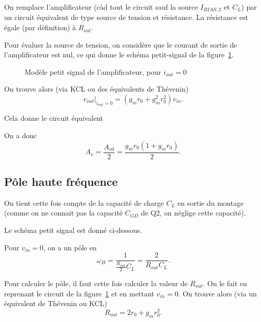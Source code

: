 \documentclass[frenchb,DIV=14]{scrartcl}
\begin{document}
On remplace l'amplificateur (càd tout le circuit sauf la source $I_{BIAS,2}$ et $C_L$)
par un circuit équivalent de type source de tension et résistance.
La résistance est égale (par définition) à $R_{out}$.

Pour évaluer la source de tension, on considère que le courant de sortie de
l'amplificateur est nul, ce qui donne le schéma petit-signal de la figure~\ref{fig:pt-sig-3-ampl}.

\begin{figure}[h]
	\centering
        \caption{Modèle petit signal de l'amplificateur, pour $i_{out} = 0$}
	\label{fig:pt-sig-3-ampl}
\end{figure}

On trouve alors (via KCL ou des équivalents de Thévenin)
\[\left.v_{out}\right|_{i_{out}=0} = (g_m r_0 + g_m^2 r_0^2)v_{in}.\]

Cela donne le circuit équivalent
\begin{center}
\end{center}

On a donc \[A_v = \frac{A_{v0}}{2} = \frac{g_mr_0(1+g_mr_0)}{2}.\]

\subsection*{Pôle haute fréquence}

On tient cette fois compte de la capacité de charge $C_L$ en sortie du montage
(comme on ne connait pas la capacité $C_{GD}$ de Q2, on néglige cette capacité).

Le schéma petit signal est donné ci-dessous.
\begin{center}
\end{center}

Pour $v_{in} = 0$, on a un pôle en
\[\omega_H = \frac{1}{\frac{R_{out}}{2}C_L} = \frac{2}{R_{out}C_L}.\]

Pour calculer le pôle, il faut cette fois calculer la valeur de $R_{out}$.
On le fait en reprenant le circuit de la figure~\ref{fig:pt-sig-3-ampl} et
en mettant $v_{in} = 0$. On trouve alors (via un équivalent de Thévenin
ou KCL)
\[R_{out} = 2r_0 + g_m r_0^2.\]
\end{document}

